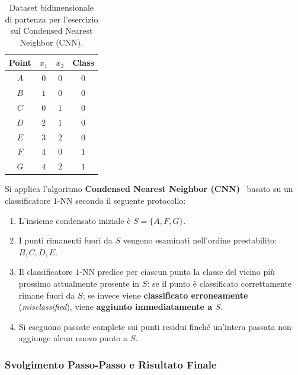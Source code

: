 \begin{table}[H]
\centering
\caption{Dataset bidimensionale di partenza per l'esercizio sul Condensed Nearest Neighbor (CNN).}
\label{tab:dm-ex-cnn-data}
\small
\begin{tabular}{cccc}
\toprule
\textbf{Point} & $x_1$ & $x_2$ & \textbf{Class} \\
\midrule
$A$ & $0$ & $0$ & $0$ \\
$B$ & $1$ & $0$ & $0$ \\
$C$ & $0$ & $1$ & $0$ \\
$D$ & $2$ & $1$ & $0$ \\
$E$ & $3$ & $2$ & $0$ \\
$F$ & $4$ & $0$ & $1$ \\
$G$ & $4$ & $2$ & $1$ \\
\bottomrule
\end{tabular}
\end{table}

Si applica l'algoritmo \textbf{Condensed Nearest Neighbor (CNN)}~\cite{hart1968} basato su un classificatore $1$-NN secondo il seguente protocollo:
\begin{enumerate}
    \item L'insieme condensato iniziale \`e $S = \{A, F, G\}$.
    \item I punti rimanenti fuori da $S$ vengono esaminati nell'ordine prestabilito: $B, C, D, E$.
    \item Il classificatore $1$-NN predice per ciascun punto la classe del vicino pi\`u prossimo attualmente presente in $S$: se il punto \`e classificato correttamente rimane fuori da $S$; se invece viene \textbf{classificato erroneamente} (\textit{misclassified}), viene \textbf{aggiunto immediatamente a $S$}.
    \item Si eseguono passate complete sui punti residui finch\'e un'intera passata non aggiunge alcun nuovo punto a $S$.
\end{enumerate}

\FloatBarrier
\subsubsection{Svolgimento Passo-Passo e Risultato Finale}
\label{subsec:dm-ex-cnn-steps}

